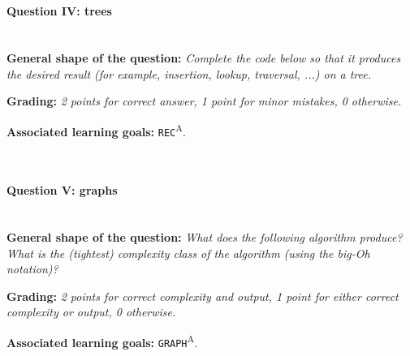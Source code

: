 \ \\ 
\paragraph*{Question IV: trees} \ \\

\textbf{General shape of the question:} \textit{Complete the code below so that it produces the desired result (for example, insertion, lookup, traversal, ...) on a tree.} \ 

\textbf{Grading:} \textit{2 points for correct answer, 1 point for minor mistakes, 0 otherwise.} \ 

\textbf{Associated learning goals:} \texttt{REC}\textsuperscript{A}.

\ \\ 
\paragraph*{Question V: graphs} \ \\

\textbf{General shape of the question:} \textit{What does the following algorithm produce? What is the (tightest) complexity class of the algorithm (using the big-Oh notation)?} \ 

\textbf{Grading:} \textit{2 points for correct complexity and output, 1 point for either correct complexity or output, 0 otherwise.} \ 

\textbf{Associated learning goals:} \texttt{GRAPH}\textsuperscript{A}.

\ \\ 




\begin{comment}
	\begin{tabular}{|p{3cm}|p{3.5cm}|p{6cm}|}
		\hline
		\textbf{Learning goal} & \textbf{Dublin descriptors} & \textbf{Tested through} \\
		\hline
		\texttt{KNOW} & 1 & Theoretical examination \\
		\hline
		\texttt{IMPL} & 2 & Practical examination \\
		\hline
		\texttt{AN} & 3 & Theoretical examination \\
		\hline
		\texttt{APP} & 2, 3 & Theoretical and practical examination \\
		\hline
	\end{tabular}
	
	\vspace{1cm}

	Dublin-descriptors:
	\begin{enumerate}
		\item Knowledge and understanding
		\item Applying knowledge and understanding
		\item Making judgements
		\item Communication
		\item Learning skills
	\end{enumerate}
\end{comment}